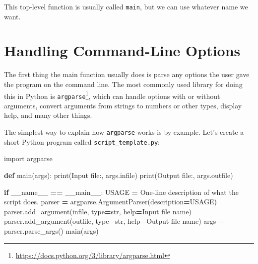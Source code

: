 \documentclass[
]{krantz}
\makeatletter
\newenvironment{Shaded}{\begin{snugshade}}{\end{snugshade}}
\newcommand{\BuiltInTok}[1]{#1}
\newcommand{\ControlFlowTok}[1]{\textcolor[rgb]{0.13,0.29,0.53}{\textbf{#1}}}
\newcommand{\ImportTok}[1]{#1}
\newcommand{\KeywordTok}[1]{\textcolor[rgb]{0.13,0.29,0.53}{\textbf{#1}}}
\newcommand{\NormalTok}[1]{#1}
\newcommand{\OperatorTok}[1]{\textcolor[rgb]{0.81,0.36,0.00}{\textbf{#1}}}
\newcommand{\StringTok}[1]{\textcolor[rgb]{0.31,0.60,0.02}{#1}}
\newcommand{\VariableTok}[1]{\textcolor[rgb]{0.00,0.00,0.00}{#1}}
\renewcommand{\href}[2]{#2\footnote{\url{#1}}}
\newenvironment{kframe}{%
\medskip{}
\setlength{\fboxsep}{.8em}
 \def\at@end@of@kframe{}%
 \ifinner\ifhmode%
  \def\at@end@of@kframe{\end{minipage}}%
  \begin{minipage}{\columnwidth}%
 \fi\fi%
 \def\FrameCommand##1{\hskip\@totalleftmargin \hskip-\fboxsep
 \colorbox{shadecolor}{##1}\hskip-\fboxsep
     \hskip-\linewidth \hskip-\@totalleftmargin \hskip\columnwidth}%
 \MakeFramed {\advance\hsize-\width
   \@totalleftmargin\z@ \linewidth\hsize
   \@setminipage}}%
 {\par\unskip\endMakeFramed%
 \at@end@of@kframe}
\renewenvironment{Shaded}{\begin{kframe}}{\end{kframe}}
\makeatother
\begin{document}
This top-level function is usually called \texttt{main},
but we can use whatever name we want.

\hypertarget{scripting-options}{%
\section{Handling Command-Line Options}\label{scripting-options}}

The first thing the main function usually does
is parse any options the user gave the program on the command line.
The most commonly used library for doing this in Python is \href{https://docs.python.org/3/library/argparse.html}{\texttt{argparse}},
which can handle options with or without arguments,
convert arguments from strings to numbers or other types,
display help,
and many other things.

The simplest way to explain how \texttt{argparse} works is by example.
Let's create a short Python program called \texttt{script\_template.py}:

\begin{Shaded}
\begin{Highlighting}[]
\ImportTok{import}\NormalTok{ argparse}


\KeywordTok{def}\NormalTok{ main(args):}
    \BuiltInTok{print}\NormalTok{(}\StringTok{\textquotesingle{}Input file:\textquotesingle{}}\NormalTok{, args.infile)}
    \BuiltInTok{print}\NormalTok{(}\StringTok{\textquotesingle{}Output file:\textquotesingle{}}\NormalTok{, args.outfile)}


\ControlFlowTok{if} \VariableTok{\_\_name\_\_} \OperatorTok{==} \StringTok{\textquotesingle{}\_\_main\_\_\textquotesingle{}}\NormalTok{:}
\NormalTok{    USAGE }\OperatorTok{=} \StringTok{\textquotesingle{}One{-}line description of what the script does.\textquotesingle{}}
\NormalTok{    parser }\OperatorTok{=}\NormalTok{ argparse.ArgumentParser(description}\OperatorTok{=}\NormalTok{USAGE)}
\NormalTok{    parser.add\_argument(}\StringTok{\textquotesingle{}infile\textquotesingle{}}\NormalTok{, }\BuiltInTok{type}\OperatorTok{=}\BuiltInTok{str}\NormalTok{, }\BuiltInTok{help}\OperatorTok{=}\StringTok{\textquotesingle{}Input file name\textquotesingle{}}\NormalTok{)}
\NormalTok{    parser.add\_argument(}\StringTok{\textquotesingle{}outfile\textquotesingle{}}\NormalTok{, }\BuiltInTok{type}\OperatorTok{=}\BuiltInTok{str}\NormalTok{, }\BuiltInTok{help}\OperatorTok{=}\StringTok{\textquotesingle{}Output file name\textquotesingle{}}\NormalTok{)}
\NormalTok{    args }\OperatorTok{=}\NormalTok{ parser.parse\_args()}
\NormalTok{    main(args)}
\end{Highlighting}
\end{Shaded}
\end{document}
